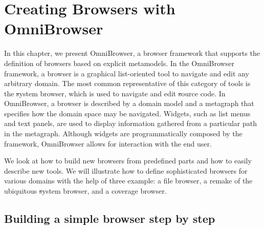 \documentclass[a4paper,10pt,twoside]{book}
\begin{document}
	\sloppy
\fi

\newcommand{\ob}{Omni\-Brow\-ser\xspace}
\newcommand{\obf}{Omni\-Brow\-ser framework\xspace}
\newcommand{\applflab}{ApplFLab\xspace}



\chapter{Creating Browsers with OmniBrowser}


\noindent
In this chapter, we present \ob, a browser framework that supports the definition of browsers based on explicit metamodels. In the \obf, a browser is a graphical list-oriented tool to navigate and edit any arbitrary domain. The most common representative of this category of tools is the \st system browser, which is used to navigate and edit \st source code.
In \ob, a browser is described by a domain model and a metagraph that specifies how the domain space may be navigated. Widgets, such as list menus and text panels, are used to display information gathered from a particular path in the metagraph. Although widgets are programmatically composed by the framework, \ob allows for interaction with the end user.


We look at how to build new browsers from predefined parts and how to easily describe new tools. We will illustrate how to define sophisticated browsers for various domains with the help of three example: a file browser, a remake of the ubiquitous \st system browser, and a coverage browser.

\section{Building a simple browser step by step}\label{sec:introduction}
\end{document}
